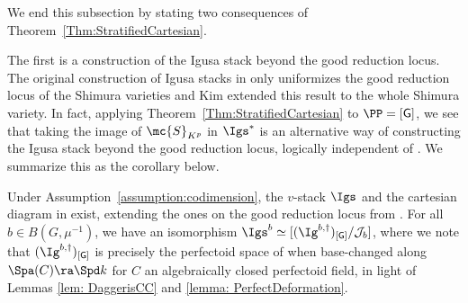 \documentclass[letterpaper,11pt]{amsart}
\begin{document}
We end this subsection by stating two consequences of Theorem~\ref{Thm:StratifiedCartesian}.  

The first is a construction of the Igusa stack beyond the good reduction locus. The original construction of Igusa stacks in \cite[Theorem 1.3]{zhang2023} only uniformizes the good reduction locus of the Shimura varieties and Kim \cite{Kim} extended this result to the whole Shimura variety. In fact, applying Theorem~\ref{Thm:StratifiedCartesian} to $\PP=[\mathsf{G}]$, we see that taking the image of $\mc{S}_{K^p}$ in $\Igs^\ast$ is an alternative way of constructing the Igusa stack beyond the good reduction locus, logically independent of \cite{Kim}. We summarize this as the corollary below.
\begin{corollary}\label{cor: BeyondGoodRed}
     Under Assumption~\ref{assumption:codimension}, the $v$-stack $\Igs$ and the cartesian diagram in \cite[Conjecture 1.1(1)]{zhang2023} exist, extending the ones on the good reduction locus from \cite[Theorem 1.3]{zhang2023}. For all $b \in B(G,\mu^{-1})$, we have an isomorphism $\Igs^{b} \simeq [(\Ig^{b,\dagger})_{[\mathsf{G}]}/\mathcal{J}_{b}]$, where we note that $(\Ig^{b,\dagger})_{[\mathsf{G}]}$ is precisely the perfectoid space of \cite[Corollary~3.4]{HamannLeeTorsion} when base-changed along $\Spa(C) \ra \Spd k$ for $C$ an algebraically closed perfectoid field, in light of Lemmas \ref{lem: DaggerisCC} and \ref{lemma: PerfectDeformation}.
\end{corollary}
\end{document}
